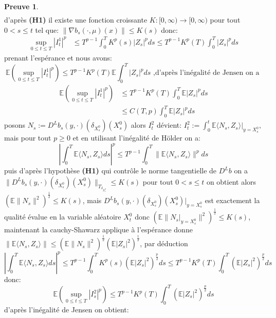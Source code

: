 \documentclass[12pt,a4paper,twoside,fleqn]{book}%
\theoremstyle{definition}
\newtheorem*{pr}{\textbf{Preuve}}
\theoremstyle{lemme}
\numberwithin{equation}{section}
\begin{document}
\begin{pr}
\[\begin{aligned}
\end{aligned}
\]
d'après \textbf{(H1)} il existe une fonction croissante  $K:[0,\infty)\to [0,\infty)$ pour tout $0<s\leq t$ tel que: $\|\nabla b_s(\cdot,\mu)(x)\|\leq K(s)$ donc:
\[
\begin{aligned}
	\sup_{0\leq t \leq T}|I_t^1|^p&\leq T^{p-1}\int_{0}^{T}K^p(s)|Z_s|^pds\leq T^{p-1}K^p(T)\int_{0}^{T}|Z_s|^pds 
\end{aligned}
\]
prenant l'espérance et nous avons:
\[
	\mathbb{E}\left(\sup_{0\leq t \leq T}|I_t^1|^p\right)\leq T^{p-1}K^p(T)\mathbb{E}\int_{0}^{T}|Z_s|^pds \text{ ,d'après l'inégalité de Jensen on a  }
\]
\begin{equation}\label{eq:2.2.29}
	\begin{aligned}
	\mathbb{E}\left(\sup_{0\leq t \leq T}|I_t^1|^p\right)&\leq T^{p-1}K^p(T)\int_{0}^{T}\mathbb{E}|Z_s|^pds\\
	&\leq C(T,p)\int_{0}^{T}\mathbb{E}|Z_s|^pds
\end{aligned}
\end{equation}
posons $N_s:=D^Lb_s(y,\cdot)(\delta_{X_s^0})(X_s^0)$ alors $I_t^2$ dévient: $I_t^2:=\int_{0}^{t}\mathbb{E}\langle N_s,Z_s\rangle|_{y=X_s^0},$ mais pour tout $p\geq 0$ et en utilisant l'inégalité de Hölder on a:
\[
\left|\int_{0}^{T}\mathbb{E}\langle N_s,Z_s\rangle ds\right|^p\leq T^{p-1}\int_{0}^{T}\|\mathbb{E}\langle N_s,Z_s\rangle \|^pds
\]
puis d'après l'hypothèse \textbf{(H1)} qui contrôle le norme tangentielle de $D^Lb$ on a\\ $\|D^Lb_s(y,\cdot)(\delta_{X_s^0})(X_s^0)\|_{T_{\delta_{X_s^0}}}\leq K(s)$  pour tout $0<s\leq t$ on obtient alors $\left(\mathbb{E}\|N_s\|^2\right)^{\frac{1}{2}}\leq K(s)$, mais $D^Lb_s(y,\cdot)(\delta_{X_s^0})(X_s^0)|_{y=X_s^0}$ est exactement la qualité évalue en la variable aléatoire $X_t^0$ donc $\left(\mathbb{E}\|N_s|_{y=X_s^0}\|^2\right)^{\frac{1}{2}}\leq K(s)$, maintenant la cauchy-Shawarz applique à l'espérance donne $\|\mathbb{E}\langle N_s,Z_s\rangle\| \leq \left(\mathbb{E}\|N_s\|^2\right)^{\frac{1}{2}}\left(\mathbb{E}|Z_s|^2\right)^{\frac{1}{2}}
$, par déduction 
\[
\left|\int_{0}^{T}\mathbb{E}\langle N_s,Z_s\rangle ds\right|^p\leq T^{p-1}\int_{0}^{T}K^p(s)\left(\mathbb{E}|Z_s|^2\right)^{\frac{p}{2}}ds\leq T^{p-1}K^p(T)\int_{0}^{T}\left(\mathbb{E}|Z_s|^2\right)^{\frac{p}{2}}ds
\]
donc:
\[\mathbb{E}\left(\sup_{0\leq t \leq T}|I_s^2|^p\right)\leq T^{p-1}K^p(T)\int_{0}^{T}\left(\mathbb{E}|Z_s|^2\right)^{\frac{p}{2}}ds\]
d'après l'inégalité de Jensen on obtient:
\begin{equation}\label{eq:2.2.30}

\end{equation}
\end{pr}
\end{document}
